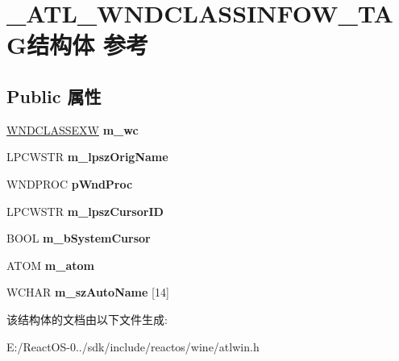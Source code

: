 \hypertarget{struct___a_t_l___w_n_d_c_l_a_s_s_i_n_f_o_w___t_a_g}{}\section{\+\_\+\+A\+T\+L\+\_\+\+W\+N\+D\+C\+L\+A\+S\+S\+I\+N\+F\+O\+W\+\_\+\+T\+A\+G结构体 参考}
\label{struct___a_t_l___w_n_d_c_l_a_s_s_i_n_f_o_w___t_a_g}
\subsection*{Public 属性}
\begin{DoxyCompactItemize}
\item 
\mbox{\label{struct___a_t_l___w_n_d_c_l_a_s_s_i_n_f_o_w___t_a_g_a8a87187fa109e8164df16905ef923c9c}} 
\hyperlink{struct___w_n_d_c_l_a_s_s_e_x_w}{W\+N\+D\+C\+L\+A\+S\+S\+E\+XW} {\bfseries m\+\_\+wc}
\item 
\mbox{\label{struct___a_t_l___w_n_d_c_l_a_s_s_i_n_f_o_w___t_a_g_ab47f44df92921c3964b3dc24eeabebef}} 
L\+P\+C\+W\+S\+TR {\bfseries m\+\_\+lpsz\+Orig\+Name}
\item 
\mbox{\label{struct___a_t_l___w_n_d_c_l_a_s_s_i_n_f_o_w___t_a_g_a9da6bc0522d7c050a8605905c9fce610}} 
W\+N\+D\+P\+R\+OC {\bfseries p\+Wnd\+Proc}
\item 
\mbox{\label{struct___a_t_l___w_n_d_c_l_a_s_s_i_n_f_o_w___t_a_g_a0230c48f87eb11dcac54f876fbf3680f}} 
L\+P\+C\+W\+S\+TR {\bfseries m\+\_\+lpsz\+Cursor\+ID}
\item 
\mbox{\label{struct___a_t_l___w_n_d_c_l_a_s_s_i_n_f_o_w___t_a_g_a9fdc0bb4d544530f8ccccd5cb70debc2}} 
B\+O\+OL {\bfseries m\+\_\+b\+System\+Cursor}
\item 
\mbox{\label{struct___a_t_l___w_n_d_c_l_a_s_s_i_n_f_o_w___t_a_g_ab1b522234856470eaa2510b90e371278}} 
A\+T\+OM {\bfseries m\+\_\+atom}
\item 
\mbox{\label{struct___a_t_l___w_n_d_c_l_a_s_s_i_n_f_o_w___t_a_g_abe6f1485118f2140d3722856338604f3}} 
W\+C\+H\+AR {\bfseries m\+\_\+sz\+Auto\+Name} \mbox{[}14\mbox{]}
\end{DoxyCompactItemize}


该结构体的文档由以下文件生成\+:\begin{DoxyCompactItemize}
\item 
E\+:/\+React\+O\+S-\/0../sdk/include/reactos/wine/atlwin.\+h\end{DoxyCompactItemize}
